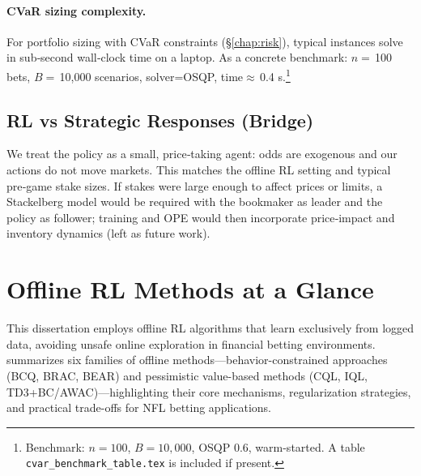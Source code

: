 \paragraph{CVaR sizing complexity.} For portfolio sizing with CVaR constraints (\S\ref{chap:risk}), typical instances solve in sub‑second wall‑clock time on a laptop. As a concrete benchmark: $n=\,$100 bets, $B=\,$10{,}000 scenarios, solver=OSQP, time$\approx\,$0.4 s.\footnote{Benchmark: $n=100$, $B=10{,}000$, OSQP 0.6, warm-started. A table \texttt{cvar\_benchmark\_table.tex} is included if present.}


\subsection{RL vs Strategic Responses (Bridge)}
We treat the policy as a small, price‑taking agent: odds are exogenous and our actions do not move markets. This matches the offline RL setting and typical pre‑game stake sizes. If stakes were large enough to affect prices or limits, a Stackelberg model would be required with the bookmaker as leader and the policy as follower; training and OPE would then incorporate price‑impact and inventory dynamics (left as future work).

\section{Offline RL Methods at a Glance}
This dissertation employs offline RL algorithms that learn exclusively from logged data, avoiding unsafe online exploration in financial betting environments.  summarizes six families of offline methods—behavior-constrained approaches (BCQ, BRAC, BEAR) and pessimistic value-based methods (CQL, IQL, TD3+BC/AWAC)—highlighting their core mechanisms, regularization strategies, and practical trade-offs for NFL betting applications.

